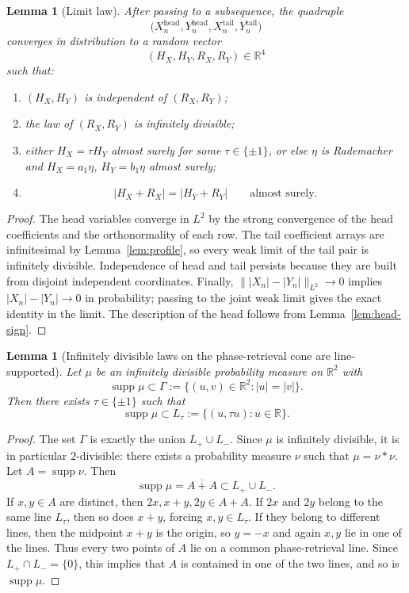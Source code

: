 \documentclass[11pt]{amsart}
\numberwithin{equation}{section}
\newtheorem{lemma}[theorem]{Lemma}
\theoremstyle{definition}
\theoremstyle{remark}
\newcommand{\R}{\mathbb R}
\newcommand{\supp}{\operatorname{supp}}
\newcommand{\abs}[1]{\lvert #1 \rvert}
\newcommand{\norm}[1]{\lVert #1 \rVert}
\begin{document}
\begin{lemma}[Limit law]\label{lem:limit-law}
After passing to a subsequence, the quadruple
\[
\bigl(X_n^{\mathrm{head}},Y_n^{\mathrm{head}},
X_n^{\mathrm{tail}},Y_n^{\mathrm{tail}}\bigr)
\]
converges in distribution to a random vector
\[
(H_X,H_Y,R_X,R_Y)\in\R^4
\]
such that:
\begin{enumerate}[label=\rm(\arabic*)]
\item $(H_X,H_Y)$ is independent of $(R_X,R_Y)$;
\item the law of $(R_X,R_Y)$ is infinitely divisible;
\item either $H_X=\tau H_Y$ almost surely for some $\tau\in\{\pm1\}$, or
else $\eta$ is Rademacher and
$H_X=a_1\eta$, $H_Y=b_1\eta$ almost surely;
\item
\[
\abs{H_X+R_X}=\abs{H_Y+R_Y}
\qquad\text{almost surely.}
\]
\end{enumerate}
\end{lemma}

\begin{proof}
The head variables converge in $L^2$ by the strong convergence of the head
coefficients and the orthonormality of each row.  The tail coefficient arrays
are infinitesimal by Lemma~\ref{lem:profile}, so every weak limit of the
tail pair is infinitely divisible.  Independence of head and tail persists
because they are built from disjoint independent coordinates.  Finally,
$\norm{\abs{X_n}-\abs{Y_n}}_{L^2}\to0$ implies
$\abs{X_n}-\abs{Y_n}\to0$ in probability; passing to the joint weak limit
gives the exact identity in the limit.  The description of the head follows
from Lemma~\ref{lem:head-sign}.
\end{proof}

\begin{lemma}[Infinitely divisible laws on the phase-retrieval cone are
line-supported]\label{lem:id-line}
Let $\mu$ be an infinitely divisible probability measure on $\R^2$ with
\[
\supp\mu\subset\Gamma:=\{(u,v)\in\R^2:\abs{u}=\abs{v}\}.
\]
Then there exists $\tau\in\{\pm1\}$ such that
\[
\supp\mu\subset L_\tau:=\{(u,\tau u):u\in\R\}.
\]
\end{lemma}

\begin{proof}
The set $\Gamma$ is exactly the union $L_+\cup L_-$.  Since $\mu$ is
infinitely divisible, it is in particular $2$-divisible: there exists a
probability measure $\nu$ such that $\mu=\nu*\nu$.  Let $A=\supp\nu$.  Then
\[
\supp\mu=\overline{A+A}\subset L_+\cup L_-.
\]
If $x,y\in A$ are distinct, then $2x,x+y,2y\in A+A$.  If $2x$ and $2y$ belong
to the same line $L_\tau$, then so does $x+y$, forcing $x,y\in L_\tau$.  If
they belong to different lines, then the midpoint $x+y$ is the origin, so
$y=-x$ and again $x,y$ lie in one of the lines.  Thus every two points of $A$
lie on a common phase-retrieval line.  Since $L_+\cap L_-=\{0\}$, this implies
that $A$ is contained in one of the two lines, and so is $\supp\mu$.
\end{proof}
\end{document}

